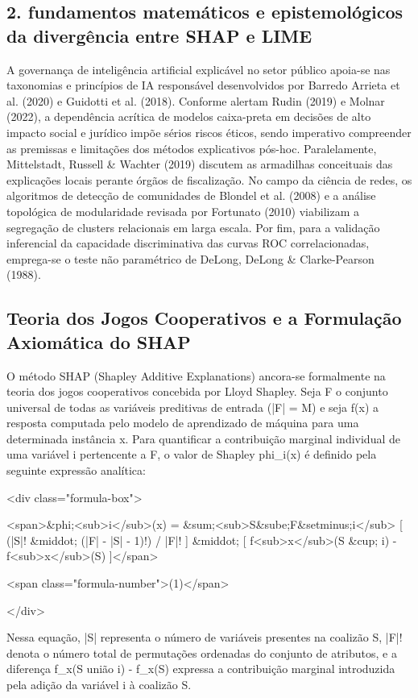 \documentclass[12pt,a4paper]{article}
\begin{document}
\subsection{2. fundamentos matemáticos e epistemológicos da divergência entre SHAP e LIME}

A governança de inteligência artificial explicável no setor público apoia-se nas taxonomias e princípios de IA responsável desenvolvidos por Barredo Arrieta et al. (2020) e Guidotti et al. (2018). Conforme alertam Rudin (2019) e Molnar (2022), a dependência acrítica de modelos caixa-preta em decisões de alto impacto social e jurídico impõe sérios riscos éticos, sendo imperativo compreender as premissas e limitações dos métodos explicativos pós-hoc. Paralelamente, Mittelstadt, Russell \& Wachter (2019) discutem as armadilhas conceituais das explicações locais perante órgãos de fiscalização. No campo da ciência de redes, os algoritmos de detecção de comunidades de Blondel et al. (2008) e a análise topológica de modularidade revisada por Fortunato (2010) viabilizam a segregação de clusters relacionais em larga escala. Por fim, para a validação inferencial da capacidade discriminativa das curvas ROC correlacionadas, emprega-se o teste não paramétrico de DeLong, DeLong \& Clarke-Pearson (1988).


\subsection{Teoria dos Jogos Cooperativos e a Formulação Axiomática do SHAP}

O método SHAP (Shapley Additive Explanations) ancora-se formalmente na teoria dos jogos cooperativos concebida por Lloyd Shapley. Seja F o conjunto universal de todas as variáveis preditivas de entrada (|F| = M) e seja f(x) a resposta computada pelo modelo de aprendizado de máquina para uma determinada instância x. Para quantificar a contribuição marginal individual de uma variável i pertencente a F, o valor de Shapley phi\_i(x) é definido pela seguinte expressão analítica:

<div class="formula-box">

<span>\&phi;<sub>i</sub>(x) = \&sum;<sub>S\&sube;F\&setminus;{i}</sub> [ (|S|! \&middot; (|F| - |S| - 1)!) / |F|! ] \&middot; [ f<sub>x</sub>(S \&cup; {i}) - f<sub>x</sub>(S) ]</span>

<span class="formula-number">(1)</span>

</div>

Nessa equação, |S| representa o número de variáveis presentes na coalizão S, |F|! denota o número total de permutações ordenadas do conjunto de atributos, e a diferença f\_x(S união {i}) - f\_x(S) expressa a contribuição marginal introduzida pela adição da variável i à coalizão S.
\end{document}
